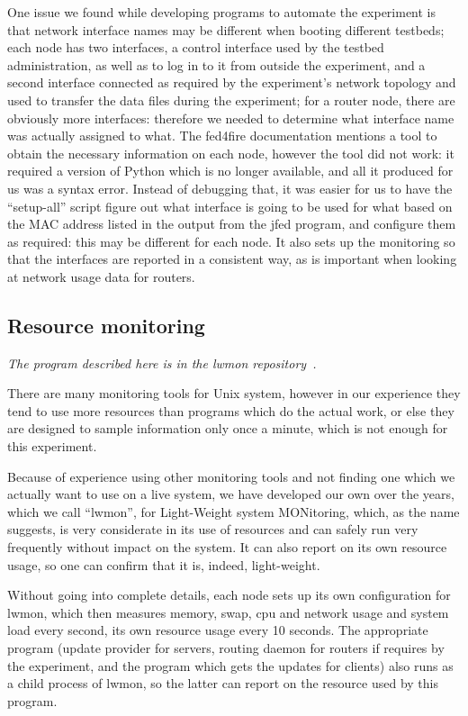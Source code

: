 \documentclass[a4paper,11pt,twocolumn]{article}
\begin{document}
One issue we found while developing programs to automate the experiment
is that network interface names may be different when booting different
testbeds; each node has two interfaces, a control interface used by
the testbed administration, as well as to log in to it from outside
the experiment, and a second interface connected as required by the
experiment's network topology and used to transfer the data files during
the experiment; for a router node, there are obviously more interfaces:
therefore we needed to determine what interface name was actually
assigned to what.  The fed4fire documentation mentions a tool to obtain
the necessary information on each node, however the tool did not work:
it required a version of Python which is no longer available, and all
it produced for us was a syntax error.  Instead of debugging that,
it was easier for us to have the ``setup-all'' script figure out what
interface is going to be used for what based on the MAC address listed
in the output from the jfed program, and configure them as required:
this may be different for each node.  It also sets up the monitoring so
that the interfaces are reported in a consistent way, as is important
when looking at network usage data for routers.

\subsection{Resource monitoring}
\label{lwmon}
{\em The program described here is in the lwmon
repository~\cite{lwmon:sources}.}

There are many monitoring tools for Unix system, however in our experience
they tend to use more resources than programs which do the actual work,
or else they are designed to sample information only once a minute,
which is not enough for this experiment.

Because of experience using other monitoring tools and not finding
one which we actually want to use on a live system, we have developed
our own over the years, which we call ``lwmon'', for Light-Weight
system MONitoring, which, as the name suggests, is very considerate
in its use of resources and can safely run very frequently without
impact on the system.  It can also report on its own resource usage,
so one can confirm that it is, indeed, light-weight.

Without going into complete details, each node sets up its own
configuration for lwmon, which then measures memory, swap, cpu and
network usage and system load every second, its own resource usage every
10 seconds.  The appropriate program (update provider for servers, routing
daemon for routers if requires by the experiment, and the program which
gets the updates for clients) also runs as a child process of lwmon,
so the latter can report on the resource used by this program.
\end{document}
